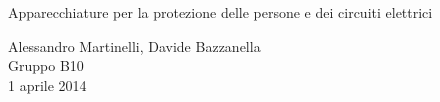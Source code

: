 \begin{center}

     	{\huge Apparecchiature per la protezione delle persone e dei circuiti elettrici}

	\vspace{0.3cm}

      	{\large Alessandro Martinelli, Davide Bazzanella} \\
     	\vspace{0.2cm}
		{\huge Gruppo B10} \\
	
	\vspace{0.1cm}
      	{ 1 aprile 2014}

\end{center}
